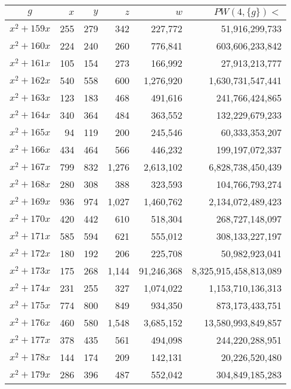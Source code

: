 \documentclass{article}
\begin{document}
\begin{center}
\begin{tabular}{ | c | r | r | r | r | r | }
$g$ & $x$ & $y$ & $z$ & $w$ & $PW(4, \{g\}) <$ \\ \hline
$x^2 + 159x$ & 255 & 279 & 342 & 227{,}772 & 51{,}916{,}299{,}733 \\ \hline
$x^2 + 160x$ & 224 & 240 & 260 & 776{,}841 & 603{,}606{,}233{,}842 \\ \hline
$x^2 + 161x$ & 105 & 154 & 273 & 166{,}992 & 27{,}913{,}213{,}777 \\ \hline
$x^2 + 162x$ & 540 & 558 & 600 & 1{,}276{,}920 & 1{,}630{,}731{,}547{,}441 \\ \hline
$x^2 + 163x$ & 123 & 183 & 468 & 491{,}616 & 241{,}766{,}424{,}865 \\ \hline
$x^2 + 164x$ & 340 & 364 & 484 & 363{,}552 & 132{,}229{,}679{,}233 \\ \hline
$x^2 + 165x$ & 94 & 119 & 200 & 245{,}546 & 60{,}333{,}353{,}207 \\ \hline
$x^2 + 166x$ & 434 & 464 & 566 & 446{,}232 & 199{,}197{,}072{,}337 \\ \hline
$x^2 + 167x$ & 799 & 832 & 1{,}276 & 2{,}613{,}102 & 6{,}828{,}738{,}450{,}439 \\ \hline
$x^2 + 168x$ & 280 & 308 & 388 & 323{,}593 & 104{,}766{,}793{,}274 \\ \hline
$x^2 + 169x$ & 936 & 974 & 1{,}027 & 1{,}460{,}762 & 2{,}134{,}072{,}489{,}423 \\ \hline
$x^2 + 170x$ & 420 & 442 & 610 & 518{,}304 & 268{,}727{,}148{,}097 \\ \hline
$x^2 + 171x$ & 585 & 594 & 621 & 555{,}012 & 308{,}133{,}227{,}197 \\ \hline
$x^2 + 172x$ & 180 & 192 & 206 & 225{,}708 & 50{,}982{,}923{,}041 \\ \hline
$x^2 + 173x$ & 175 & 268 & 1{,}144 & 91{,}246{,}368 & 8{,}325{,}915{,}458{,}813{,}089 \\ \hline
$x^2 + 174x$ & 231 & 255 & 327 & 1{,}074{,}022 & 1{,}153{,}710{,}136{,}313 \\ \hline
$x^2 + 175x$ & 774 & 800 & 849 & 934{,}350 & 873{,}173{,}433{,}751 \\ \hline
$x^2 + 176x$ & 460 & 580 & 1{,}548 & 3{,}685{,}152 & 13{,}580{,}993{,}849{,}857 \\ \hline
$x^2 + 177x$ & 378 & 435 & 561 & 494{,}098 & 244{,}220{,}288{,}951 \\ \hline
$x^2 + 178x$ & 144 & 174 & 209 & 142{,}131 & 20{,}226{,}520{,}480 \\ \hline
$x^2 + 179x$ & 286 & 396 & 487 & 552{,}042 & 304{,}849{,}185{,}283 \\ \hline

\end{tabular}
\end{center}
\end{document}
